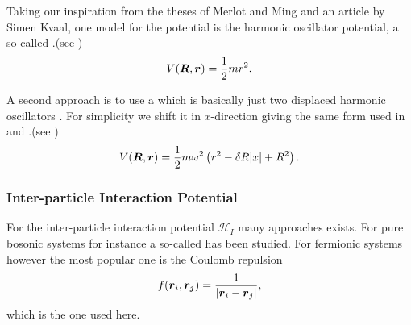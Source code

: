     Taking our inspiration from the theses of Merlot and Ming and an article by
    Simen Kvaal\cite{kvaaldots}, one model for the 
    potential is the harmonic oscillator potential, a so-called
    .(see )
        \begin{equation}
            V(\boldsymbol{{R}},\boldsymbol{{r}}) = \frac{1}{2}mr^2.
        \end{equation}

    A second approach is to use a  which is basically just
    two displaced harmonic oscillators \cite{ddotnuc,yangthesis}. For
    simplicity we shift it in $x$-direction giving the same form used in
    \cite{yangthesis, merlotthesis, jorgenThesis} and \cite{nonIsoGauss}.(see
    )
        \begin{equation}
            V(\boldsymbol{{R}},\boldsymbol{{r}}) = \frac{1}{2}m\omega^2\left(r^2 - \delta
            R\abs{x} + R^2\right).
        \end{equation}

\subsubsection{Inter-particle Interaction Potential}
    For the inter-particle interaction potential $\mathcal{H}_I$ many
    approaches exists. For pure bosonic systems for instance a so-called
     has been studied\cite{jastrow}. For fermionic
    systems however the most popular one is the Coulomb repulsion
        \begin{equation}
            f(\boldsymbol{{r}}_i,\boldsymbol{{r_j}}) = \frac{1}{\abs{\boldsymbol{{r}}_i - \boldsymbol{{r}}_j}},
        \end{equation}
    which is the one used here.

